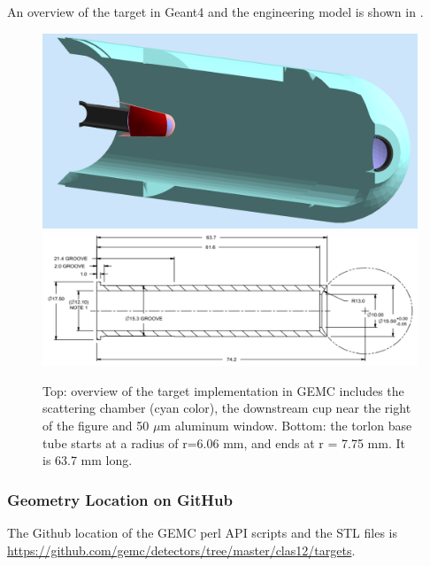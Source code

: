 An overview of the target in Geant4 and the engineering model is shown in .

\begin{figure}
	\centering
	\includegraphics[width=0.95\columnwidth,keepaspectratio]{img/targetOverview1.png}
	\includegraphics[width=0.95\columnwidth,keepaspectratio]{img/targetOverview2.png}
	\caption{Top: overview of the target implementation in GEMC includes the scattering chamber (cyan color), the
            downstream cup near the right of the figure and 50 $\mu$m aluminum window. Bottom: the torlon base
            tube starts at a radius of r=6.06 mm, and ends at r = 7.75 mm. It is 63.7 mm long.}
	\label{fig:targetOverview}
\end{figure}

\subsubsection{Geometry Location on GitHub}
The Github location of the GEMC perl API scripts and the STL files is \url{https://github.com/gemc/detectors/tree/master/clas12/targets}.





